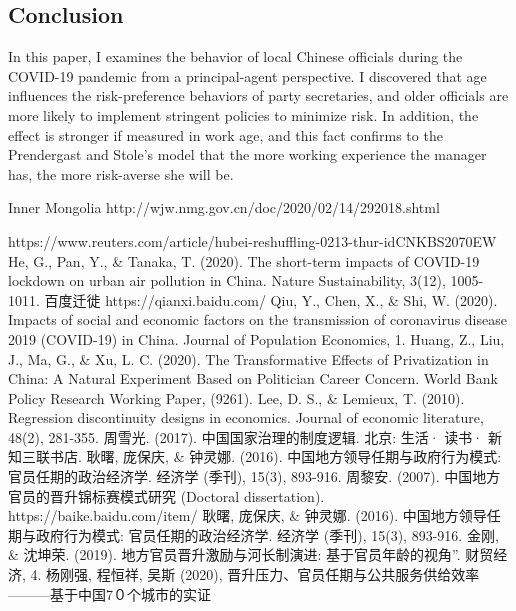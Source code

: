 \documentclass{article}
\begin{document}
\begin{CJK}{UTF8}{gbsn}
\section{Conclusion}

In this paper, I examines the behavior of local Chinese officials during the COVID-19 pandemic from a principal-agent perspective. I discovered that age influences the risk-preference behaviors of party secretaries, and older officials are more likely to implement stringent policies to minimize risk. In addition, the effect is stronger if measured in work age, and this fact confirms to the Prendergast and Stole's model that the more working experience the manager has, the more risk-averse she will be. 



\begin{thebibliography}{999}	

	Inner Mongolia http://wjw.nmg.gov.cn/doc/2020/02/14/292018.shtml


	https://www.reuters.com/article/hubei-reshuffling-0213-thur-idCNKBS2070EW
	He, G., Pan, Y., \& Tanaka, T. (2020). The short-term impacts of COVID-19 lockdown on urban air pollution in China. Nature Sustainability, 3(12), 1005-1011.
	百度迁徙 https://qianxi.baidu.com/
	Qiu, Y., Chen, X., \& Shi, W. (2020). Impacts of social and economic factors on the transmission of coronavirus disease 2019 (COVID-19) in China. Journal of Population Economics, 1.
	Huang, Z., Liu, J., Ma, G., \& Xu, L. C. (2020). The Transformative Effects of Privatization in China: A Natural Experiment Based on Politician Career Concern. World Bank Policy Research Working Paper, (9261).
	Lee, D. S., \& Lemieux, T. (2010). Regression discontinuity designs in economics. Journal of economic literature, 48(2), 281-355.
	周雪光. (2017). 中国国家治理的制度逻辑. 北京: 生活· 读书· 新知三联书店.
	耿曙, 庞保庆, \& 钟灵娜. (2016). 中国地方领导任期与政府行为模式: 官员任期的政治经济学. 经济学 (季刊), 15(3), 893-916.
	周黎安. (2007). 中国地方官员的晋升锦标赛模式研究 (Doctoral dissertation).
	https://baike.baidu.com/item/%
	耿曙, 庞保庆, \& 钟灵娜. (2016). 中国地方领导任期与政府行为模式: 官员任期的政治经济学. 经济学 (季刊), 15(3), 893-916.
	金刚, \& 沈坤荣. (2019). 地方官员晋升激励与河长制演进: 基于官员年龄的视角''. 财贸经济, 4.
	杨刚强, 程恒祥, 吴斯 (2020), 晋升压力、官员任期与公共服务供给效率———基于中国7０个城市的实证


\end{thebibliography}
\end{CJK}
\end{document}
